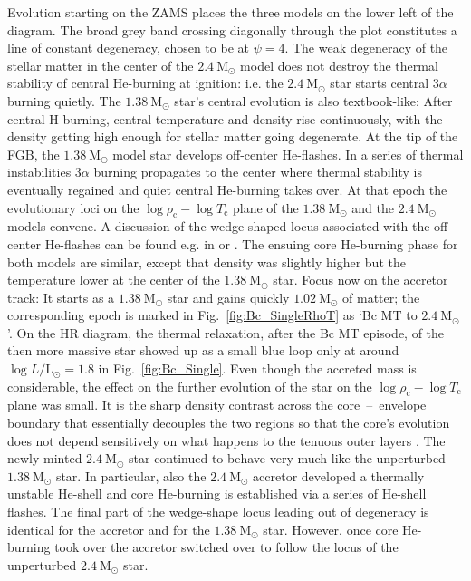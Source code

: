 \documentclass[a4paper,fleqn,usenatbib]{mnras}
\newcommand{\msol}{~\mathrm{M}_\odot}
\newcommand{\llsol}{L/\mathrm{L}_\odot}
\begin{document}
Evolution starting on the ZAMS places the three models on the lower left of the diagram. 
The broad grey band crossing diagonally
through the plot constitutes a line of constant degeneracy, 
chosen to be at $\psi=4$. The weak degeneracy of the stellar matter in the center of 
the $2.4 \msol$ model does not destroy the thermal stability of central He-burning 
at ignition: i.e. the  $2.4 \msol$ star starts central $3\alpha$ burning quietly.
The $1.38 \msol$ star's central evolution is also textbook-like: After central H-burning, 
central temperature and density rise continuously, with the density getting high enough
for stellar matter going degenerate. At the tip of the FGB, the $1.38 \msol$ model star
develops off-center He-flashes. In a series of thermal instabilities $3\alpha$ burning propagates
to the center where thermal stability is eventually regained and quiet central He-burning takes
over. At that epoch the evolutionary loci on the  $\log \rho_{\mathrm{c}} - \log T_{\mathrm{c}}$ 
plane of the $1.38 \msol$ and the $2.4 \msol$  models convene. 
A discussion of the wedge-shaped locus associated with the off-center He-flashes can
be found e.g. in \citet{Paxton2011} or \citet{Gautschy2012}.
The ensuing core He-burning phase for both models are similar, except that density was slightly
higher but the temperature lower at the center of the $1.38 \msol$ star.
Focus now on the accretor track: It starts as a $1.38 \msol$ star and gains quickly
$1.02 \msol$ of matter; the corresponding epoch is marked in 
Fig.~\ref{fig:Bc_SingleRhoT} as `Bc MT to $2.4 \msol$'. 
On the HR diagram, the thermal relaxation, after the Bc MT episode,  
of the then more massive star showed up as a small blue loop only at around $\log \llsol = 1.8$ in 
Fig.~\ref{fig:Bc_Single}. Even though the accreted mass is considerable, the effect on the
further evolution of the star on the $\log \rho_{\mathrm{c}} - \log T_{\mathrm{c}}$ plane was 
small. It is the sharp density contrast across the core~--~envelope boundary that essentially 
decouples the two regions so that the core's evolution does not depend 
sensitively on what happens to the tenuous outer layers \citep[cf.][]{Sugimoto1980}. 
The newly minted $2.4 \msol$ star continued to behave very much like the unperturbed
$1.38 \msol$ star. In particular, also the $2.4 \msol$  accretor developed a thermally unstable 
He-shell and core He-burning is established via a series of He-shell flashes. 
The final part of the wedge-shape locus leading out of degeneracy is identical for 
the accretor and for the $1.38 \msol$ star. However, once core He-burning took over the 
accretor switched over to follow the locus of the unperturbed $2.4 \msol$ star.  
\end{document}
